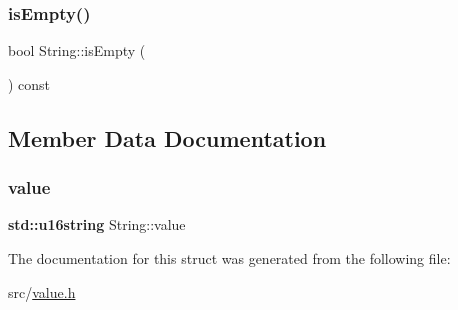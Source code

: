 \subsubsection{\texorpdfstring{is\+Empty()}{isEmpty()}}
{\footnotesize\ttfamily bool String\+::is\+Empty (\begin{DoxyParamCaption}{ }\end{DoxyParamCaption}) const\hspace{0.3cm}{\ttfamily [inline]}}



\subsection{Member Data Documentation}
\mbox{\label{struct_string_a8d279ee262f09d4e861c4578f85df015}} 
\subsubsection{\texorpdfstring{value}{value}}
{\footnotesize\ttfamily \textbf{ std\+::u16string} String\+::value}



The documentation for this struct was generated from the following file\+:\begin{DoxyCompactItemize}
\item 
src/\hyperlink{value_8h}{value.\+h}\end{DoxyCompactItemize}
